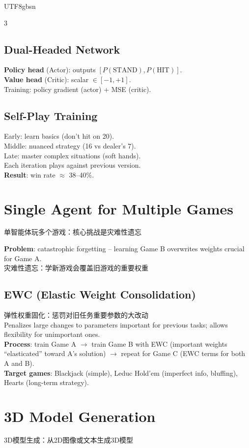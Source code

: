 \documentclass[9pt,landscape,a4paper]{article}
\newcommand{\zhint}[1]{{\scriptsize\color{gray!70!black}#1}}
\begin{document}
\begin{CJK}{UTF8}{gbsn}
\begin{multicols}{3}
\subsection{Dual-Headed Network}
\textbf{Policy head} (Actor): outputs $[P(\text{STAND}), P(\text{HIT})]$.\\
\textbf{Value head} (Critic): scalar $\in [-1, +1]$.\\
Training: policy gradient (actor) + MSE (critic).

\subsection{Self-Play Training}
Early: learn basics (don't hit on 20).\\
Middle: nuanced strategy (16 vs dealer's 7).\\
Late: master complex situations (soft hands).\\
Each iteration plays against previous version.\\
\textbf{Result}: win rate $\approx$ 38--40\%.

\section{Single Agent for Multiple Games}
\zhint{单智能体玩多个游戏：核心挑战是灾难性遗忘}

\textbf{Problem}: catastrophic forgetting -- learning Game B overwrites weights crucial for Game A.\\
\zhint{灾难性遗忘：学新游戏会覆盖旧游戏的重要权重}

\subsection{EWC (Elastic Weight Consolidation)}
\zhint{弹性权重固化：惩罚对旧任务重要参数的大改动}\\
Penalizes large changes to parameters important for previous tasks; allows flexibility for unimportant ones.\\
\textbf{Process}: train Game A $\to$ train Game B with EWC (important weights ``elasticated'' toward A's solution) $\to$ repeat for Game C (EWC terms for both A and B).\\
\textbf{Target games}: Blackjack (simple), Leduc Hold'em (imperfect info, bluffing), Hearts (long-term strategy).

\section{3D Model Generation}
\zhint{3D模型生成：从2D图像或文本生成3D模型}


\end{multicols}
\end{CJK}
\end{document}
